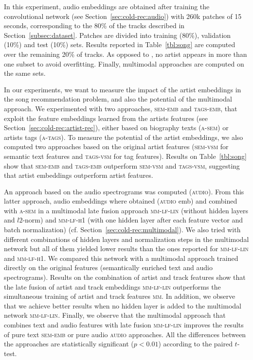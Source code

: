 In this experiment, audio embeddings are obtained after training the convolutional network (see Section~\ref{sec:cold-rec:audio}) with 260k patches of 15 seconds, corresponding to the 80\% of the tracks described in Section~\ref{subsec:dataset}. Patches are divided into training (80\%), validation (10\%) and test (10\%) sets. Results reported in Table~\ref{tbl:song} are computed over the remaining 20\% of tracks. %
As opposed to \cite{Oord2013}, no artist appears in more than one subset to avoid overfitting. Finally, multimodal approaches are computed on the same sets.

In our experiments, we want to measure the impact of the artist embeddings in the song recommendation problem, and also the potential of the multimodal approach. We experimented with two approaches, \textsc{sem-emb} and \textsc{tags-emb}, that exploit the feature embeddings learned from the artists features (see Section~\ref{sec:cold-rec:artist-rec}), either based on biography texts (\textsc{a-sem}) or artists tags (\textsc{a-tags}). To measure the potential of the artist embeddings, we also computed two approaches based on the original artist features (\textsc{sem-vsm} for semantic text features and \textsc{tags-vsm} for tag features). Results on Table~\ref{tbl:song} show that \textsc{sem-emb} and \textsc{tags-emb} outperform \textsc{sem-vsm} and \textsc{tags-vsm}, suggesting that artist embeddings outperform artist features.

An approach based on the audio spectrograms was computed (\textsc{audio}). From this latter approach, audio embeddings where obtained (\textsc{audio} emb) and combined with \textsc{a-sem} in a multimodal late fusion approach \textsc{mm-lf-lin} (without hidden layers and $l2$-norm) and \textsc{mm-lf-h1} (with one hidden layer after each feature vector and batch normalization) (cf. Section~\ref{sec:cold-rec:multimodal}). We also tried with different combinations of hidden layers and normalization steps in the multimodal network but all of them yielded lower results than the ones reported for \textsc{mm-lf-lin} and \textsc{mm-lf-h1}. We compared this network with a multimodal approach trained directly on the original features (semantically enriched text and audio spectrograms). Results on the combination of artist and track features show that the late fusion of artist and track embeddings \textsc{mm-lf-lin} outperforms the simultaneous training of artist and track features \textsc{mm}. In addition, we observe that we achieve better results when no hidden layer is added to the multimodal network \textsc{mm-lf-lin}. Finally, we observe that the multimodal approach that combines text and audio features with late fusion \textsc{mm-lf-lin} improves the results of pure text \textsc{sem-emb} or pure audio \textsc{audio} approaches. All the differences between the approaches are statistically significant ($p < 0.01$) according to the paired $t$-test.

